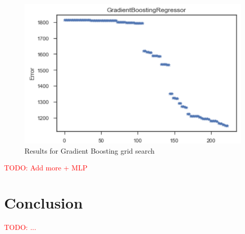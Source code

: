 \documentclass[a4paper]{article}
\newcommand\todo[1]{\textcolor{red}{TODO: #1}}
\begin{document}
\begin{figure}[H]
\centering
\includegraphics{Images/gbr.png}
\caption{Results for Gradient Boosting grid search}
\label{fig:gbr}
\end{figure}

\todo{Add more + MLP}




\section{Conclusion}
\todo{...}


\appendix
\setlength{\voffset}{0cm}
\setlength{\hoffset}{0cm}



\setlength{\voffset}{-2.54cm}
\setlength{\hoffset}{-2.54cm}

\end{document}
